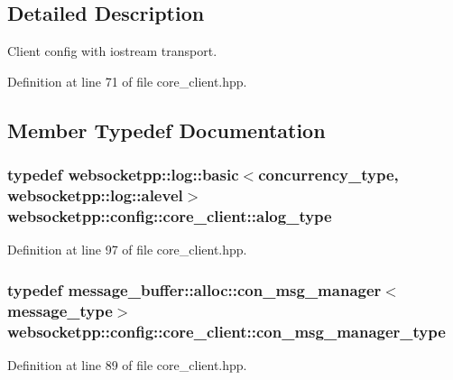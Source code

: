 \subsection{Detailed Description}
Client config with iostream transport. 

Definition at line 71 of file core\+\_\+client.\+hpp.



\subsection{Member Typedef Documentation}
\hypertarget{structwebsocketpp_1_1config_1_1core__client_a98c19fba0898e3842c001248df82fb2a}{}
\subsubsection[{alog\+\_\+type}]{\setlength{\rightskip}{0pt plus 5cm}typedef {\bf websocketpp\+::log\+::basic}$<${\bf concurrency\+\_\+type}, {\bf websocketpp\+::log\+::alevel}$>$ {\bf websocketpp\+::config\+::core\+\_\+client\+::alog\+\_\+type}}\label{structwebsocketpp_1_1config_1_1core__client_a98c19fba0898e3842c001248df82fb2a}


Definition at line 97 of file core\+\_\+client.\+hpp.

\hypertarget{structwebsocketpp_1_1config_1_1core__client_ae5d0b586e86a2520bdefe60d61849d37}{}
\subsubsection[{con\+\_\+msg\+\_\+manager\+\_\+type}]{\setlength{\rightskip}{0pt plus 5cm}typedef {\bf message\+\_\+buffer\+::alloc\+::con\+\_\+msg\+\_\+manager}$<${\bf message\+\_\+type}$>$ {\bf websocketpp\+::config\+::core\+\_\+client\+::con\+\_\+msg\+\_\+manager\+\_\+type}}\label{structwebsocketpp_1_1config_1_1core__client_ae5d0b586e86a2520bdefe60d61849d37}


Definition at line 89 of file core\+\_\+client.\+hpp.

